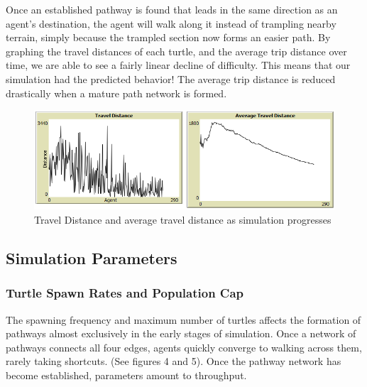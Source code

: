 \documentclass[conference]{IEEEtran}
\begin{document}
Once an established pathway is found that leads in the same direction as an agent's destination, the agent will walk along it instead of trampling nearby terrain, simply because the trampled section now forms an easier path. By graphing the travel distances of each turtle, and the average trip distance over time, we are able to see a fairly linear decline of difficulty. This means that our simulation had the predicted behavior! The average trip distance is reduced drastically when a mature path network is formed.

\begin{figure}[h]
\includegraphics[scale=0.5]{image/results3}
\caption{Travel Distance and average travel distance as simulation progresses}
\end{figure}

\subsection{Simulation Parameters}

\subsubsection{Turtle Spawn Rates and Population Cap}
The spawning frequency and maximum number of turtles affects the formation of pathways almost exclusively in the early stages of simulation. Once a network of pathways connects all four edges, agents quickly converge to walking across them, rarely taking shortcuts. (See figures 4 and 5). Once the pathway network has become established, parameters amount to throughput.
\end{document}
